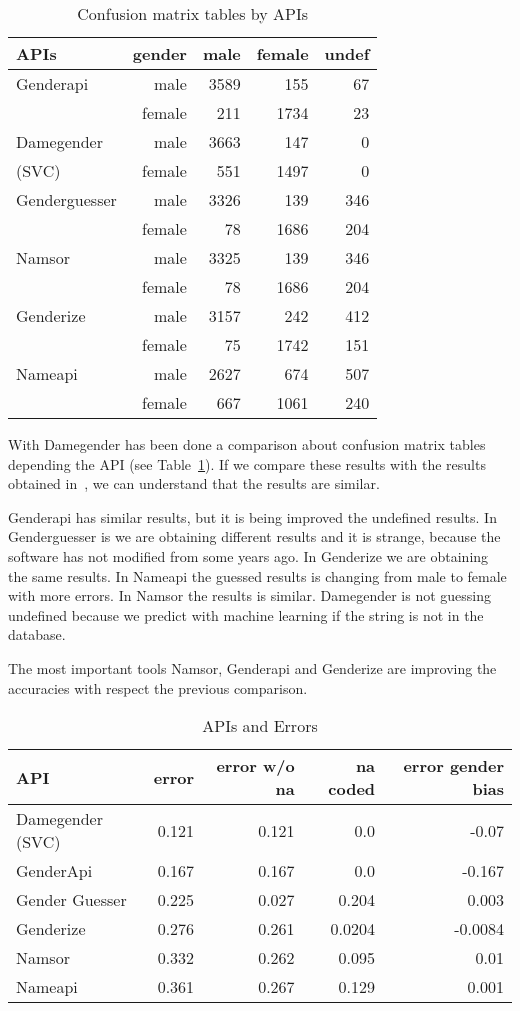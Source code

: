 \documentclass[a4paper]{article}
\begin{document}
\begin{table}
\footnotesize
\begin{tabular}[]{lrrrr}
  \hline
  APIs          & gender & male & female & undef \tabularnewline
\hline
Genderapi         & male    & 3589 & 155  &  67 \tabularnewline
                  & female  & 211  & 1734 &  23 \tabularnewline
Damegender       & male    & 3663 & 147  &   0 \tabularnewline
(SVC)\footnotemark[1] & female  & 551  & 1497 &   0 \tabularnewline
Genderguesser     & male    & 3326 &  139 & 346 \tabularnewline
                  & female  & 78   & 1686 & 204 \tabularnewline
Namsor            & male    & 3325 & 139  & 346 \tabularnewline
                  & female  & 78   & 1686 & 204 \tabularnewline
Genderize         & male    & 3157 & 242  & 412 \tabularnewline
                  & female  & 75   & 1742 & 151 \tabularnewline
Nameapi           & male    & 2627 & 674  & 507 \tabularnewline
                  & female  & 667  & 1061 & 240 \tabularnewline 
\hline
\end{tabular}
\caption{Confusion matrix tables by APIs}
\label{table:ConfusionMatrixTables}
\end{table}

With Damegender has been done a comparison about confusion matrix tables depending the API (see Table~\ref{table:ConfusionMatrixTables}).
If we compare these results with the results obtained in~\cite{10.7717/peerj-cs.156}, we can understand that the results are
similar.

Genderapi has similar results, but it is being improved the undefined results.
In Genderguesser is we are obtaining different results and it is strange, because the software has not modified from some years
ago. In Genderize we are obtaining the same results. 
In Nameapi the guessed results is changing from male to female with more errors. 
In Namsor the results is similar. 
Damegender is not guessing undefined because we predict with machine learning if the string is not in the database.

The most important tools Namsor, Genderapi and Genderize are improving the accuracies with respect the previous comparison.

\begin{table*}
\footnotesize
\begin{tabular}[]{lrrrr}
\hline
API & error & error w/o na & na coded & error gender bias\tabularnewline
\hline
Damegender (SVC)\footnotemark[1] & 0.121 & 0.121 & 0.0 & -0.07\tabularnewline
GenderApi & 0.167 & 0.167 & 0.0 & -0.167\tabularnewline
Gender Guesser & 0.225 & 0.027 & 0.204 & 0.003\tabularnewline
Genderize & 0.276 & 0.261 & 0.0204 & -0.0084 \tabularnewline 
Namsor & 0.332 & 0.262 & 0.095 & 0.01 \tabularnewline
Nameapi & 0.361 & 0.267 & 0.129 & 0.001 \tabularnewline
\hline
\end{tabular}
\caption{APIs and Errors}
\label{table:ApisAndErrors}
\end{table*}
\end{document}
